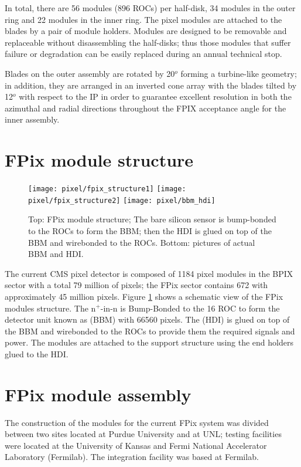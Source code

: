 In total, there are 56 modules (896 ROCs) per half-disk, 34 modules in the outer ring and 22 modules in the inner ring. The pixel modules are attached to the blades by a pair of module holders. Modules are designed to be removable and replaceable without disassembling the half-disks; thus those modules that suffer failure or degradation can be easily replaced during an annual technical stop.

Blades on the outer assembly are rotated by 20$^o$ forming a turbine-like geometry; in addition, they are arranged in an inverted cone array with the blades tilted by 12$^o$ with respect to the IP in order to guarantee excellent resolution in both the azimuthal and radial directions throughout the FPIX acceptance angle for the inner assembly.

\section{FPix module structure}

\begin{figure}[!h]
  \centering
  \texttt{[image: pixel/fpix\_structure1]}
  \texttt{[image: pixel/fpix\_structure2]}
  \texttt{[image: pixel/bbm\_hdi]}
  \caption[FPix module structure.]{Top: FPix module structure; The bare silicon sensor is bump-bonded to the ROCs to form the BBM; then the HDI is glued on top of the BBM and wirebonded to the ROCs. Bottom: pictures of actual BBM and HDI.}\label{fig:fpix_struc}
\end{figure}

The current CMS pixel detector is composed of 1184 pixel modules in the BPIX sector with a total 79 million of pixels; the FPix sector contains 672 with approximately 45 million pixels. Figure \ref{fig:fpix_struc} shows a schematic view of the FPix modules structure. The n$^{+}$-in-n  is Bump-Bonded to the 16 ROC to form the detector unit known as  (BBM) with 66560 pixels. The  (HDI) is glued on top of the BBM and wirebonded to the ROCs to provide them the required signals and power. The modules are attached to the support structure using the end holders glued to the HDI.

\section{FPix module assembly}

The construction of the modules for the current FPix system was divided between two sites located at Purdue University and at UNL; testing facilities were located at the University of Kansas and Fermi National Accelerator Laboratory (Fermilab). The integration facility was based at Fermilab. 


